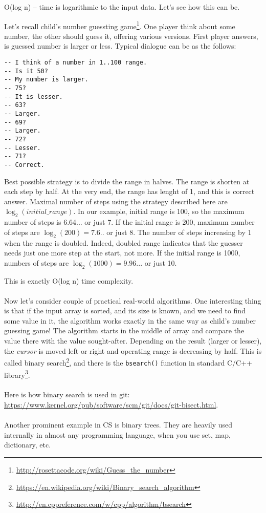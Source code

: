 O(log n) -- time is logarithmic to the input data.
Let's see how this can be.

Let's recall child's number guessting game\footnote{\url{http://rosettacode.org/wiki/Guess_the_number}}.
One player think about some number, the other should guess it, offering various versions.
First player answers, is guessed number is larger or less.
Typical dialogue can be as the follows:

\begin{lstlisting}
-- I think of a number in 1..100 range.
-- Is it 50?
-- My number is larger.
-- 75?
-- It is lesser.
-- 63?
-- Larger.
-- 69?
-- Larger.
-- 72?
-- Lesser.
-- 71?
-- Correct.
\end{lstlisting}

Best possible strategy is to divide the range in halves.
The range is shorten at each step by half.
At the very end, the range has lenght of 1, and this is correct answer.
Maximal number of steps using the strategy described here are $\log_2(initial\_range)$.
In our example, initial range is 100, so the maximum number of steps is 6.64... or just 7.
If the initial range is 200, maximum number of steps are $\log_2(200)=7.6..$ or just 8. The number of steps increasing by 1 when the range is doubled.
Indeed, doubled range indicates that the guesser needs just one more step at the start, not more.
If the initial range is 1000, numbers of steps are $\log_2(1000)=9.96...$ or just 10.

This is exactly O(log n) time complexity.\\
\\
Now let's consider couple of practical real-world algorithms.
One interesting thing is that if the input array is sorted, and its size is known, and we need to find some value in it, the algorithm works exactly
in the same way as child's number guessing game!
The algorithm starts in the middle of array and compare the value there with the value sought-after.
Depending on the result (larger or lesser), the \textit{cursor} is moved left or right and operating range is decreasing by half.
This is called binary search\footnote{\url{https://en.wikipedia.org/wiki/Binary_search_algorithm}}, and there is the \texttt{bsearch()} function in 
standard C/C++ library\footnote{\url{http://en.cppreference.com/w/cpp/algorithm/bsearch}}.\\
\\
Here is how binary search is used in git: \url{https://www.kernel.org/pub/software/scm/git/docs/git-bisect.html}.\\
\\
Another prominent example in CS is binary trees. They are heavily used internally in almost any programming language, when you use set, map, dictionary, etc.

